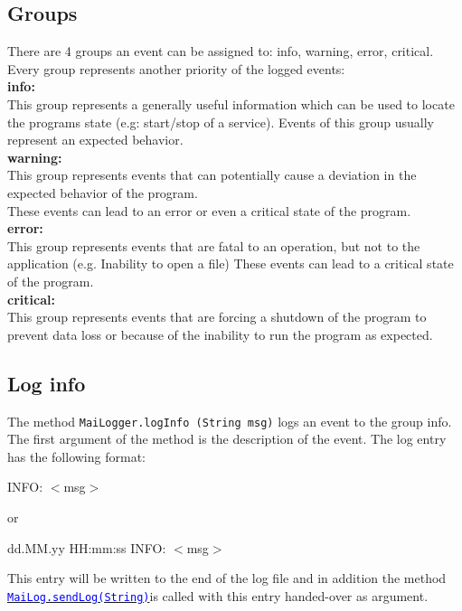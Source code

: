 \documentclass{article}
\newcommand{\refh}[2]{\hyperref[#1] {\textcolor{blue}{#2}}}
\newcommand{\sendLog}{\refh{setup_interface}{\lstinline|MaiLog.sendLog(String)|}}
\begin{document}
    \subsection{Groups}
    \label{logging_groups}
    There are 4 groups an event can be assigned to: info, warning, error, critical.
    Every group represents another priority of the logged events: \\

    \textbf{info:} \\
    This group represents a generally useful information which can be used to locate the programs state (e.g: start/stop of a service).
    Events of this group usually represent an expected behavior. \\

    \textbf{warning:} \\
    This group represents events that can potentially cause a deviation in the expected behavior of the program. \\
    These events can lead to an error or even a critical state of the program. \\

    \textbf{error:} \\
    This group represents events that are fatal to an operation, but not to the application (e.g. Inability to open a file)
    These events can lead to a critical state of the program. \\

    \textbf{critical:} \\
    This group represents events that are forcing a shutdown of the program to prevent data loss or because of the inability to run the program as expected.

    \subsection{Log info}
\label{logging_info}
    The method \lstinline|MaiLogger.logInfo (String msg)| logs an event to the group info.
    The first argument of the method is the description of the event.
    The log entry has the following format:
    \begin{description}
        \item INFO: $<$msg$>$
        \item or
        \item dd.MM.yy HH:mm:ss INFO: $<$msg$>$
    \end{description}
    This entry will be written to the end of the log file and in addition the method \sendLog is called with this entry handed-over as argument.
\end{document}

